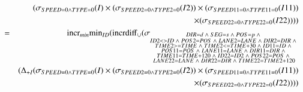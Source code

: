 \begin{eqnarray*}
&& (\sigma_{SPEED = 0 \wedge TYPE = 0} (I) \times (\sigma_{SPEED2 = 0 \wedge TYPE2 = 0} (I2)) \times (\sigma_{SPEED11 = 0 \wedge TYPE11 = 0} (I11)) \\
&&\times (\sigma_{SPEED22 = 0 \wedge TYPE22 = 0} (I22)) ) )\\
%
&=& \algincr_{min} \algmin_{ID} (\algincrdiff_{\cup} (\sigma_{ \substack{DIR = d \;\wedge\; SEG = s \;\wedge\; POS = p \;\wedge\; \\ID2 <> ID \;\wedge\; POS2 = POS \;\wedge\; LANE2 = LANE \;\wedge\; DIR2 = DIR \;\wedge\; \\ TIME2 >= TIME \;\wedge\; TIME2 <= TIME + 30 \;\wedge\; ID11 = ID \;\wedge\;\\ POS11 = POS \;\wedge\;  LANE11 = LANE \;\wedge\; DIR11=DIR \;\wedge\; \\TIME11 = TIME + 120 \;\wedge\; ID22 = ID2 \;\wedge\; POS22 = POS \;\wedge\; \\ LANE22 = LANE \;\wedge\; DIR22 = DIR \;\wedge\; TIME22 = TIME2 + 120}} \\
&& (\Delta_{+I} (\sigma_{SPEED = 0 \wedge TYPE = 0} (I) \times (\sigma_{SPEED2 = 0 \wedge TYPE2 = 0} (I2)) \times (\sigma_{SPEED11 = 0 \wedge TYPE11 = 0} (I11)) \\
&&\times (\sigma_{SPEED22 = 0 \wedge TYPE22 = 0} (I22))))\\
%
\end{eqnarray*}
